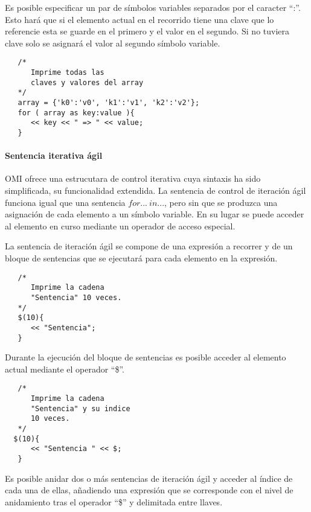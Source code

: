Es posible especificar un par de símbolos variables separados por el caracter ``:''. Esto hará que si el elemento actual en el recorrido tiene una clave que lo referencie esta se guarde en 
el primero y el valor en el segundo. Si no tuviera clave solo se asignará el valor al segundo símbolo variable. \\


\begin{lstlisting}
   /*
      Imprime todas las 
      claves y valores del array
   */
   array = {'k0':'v0', 'k1':'v1', 'k2':'v2'};
   for ( array as key:value ){
      << key << " => " << value; 
   }
\end{lstlisting}

\paragraph{Sentencia iterativa ágil} \label{sec:stmt_agil}

OMI ofrece una estrucutara de control iterativa cuya sintaxis ha sido simplificada, su funcionalidad extendida. La sentencia de control de iteración ágil funciona
igual que una sentencia $for...\ in...$, pero sin que se produzca una asignación de cada elemento a un símbolo variable. En su lugar se puede acceder al elemento 
en curso mediante un operador de acceso especial.

La sentencia de iteración ágil se compone de una expresión a recorrer y de un bloque de sentencias que se ejecutará para cada elemento en la expresión. \\

\begin{lstlisting}
   /*
      Imprime la cadena 
      "Sentencia" 10 veces.
   */
   $(10){
      << "Sentencia"; 
   }
\end{lstlisting}

Durante la ejecución del bloque de sentencias es posible acceder al elemento actual mediante el operador ``\$''. \\

\begin{lstlisting}
   /*
      Imprime la cadena 
      "Sentencia" y su indice 
      10 veces.
   */
  $(10){
      << "Sentencia " << $; 
   }
\end{lstlisting}

Es posible anidar dos o más sentencias de iteración ágil y acceder al índice de cada una de ellas, añadiendo una expresión que se corresponde con el nivel de
anidamiento tras el operador ``\$'' y delimitada entre llaves. \\


